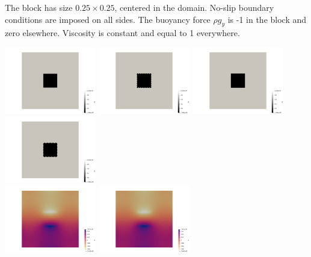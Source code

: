 The block has size $0.25\times 0.25$, centered in the domain. No-slip boundary conditions are imposed on all 
sides. The buoyancy force $\rho g_y$ is -1 in the block and zero elsewhere. Viscosity is constant and 
equal to 1 everywhere. 

\begin{center}
\includegraphics[width=4cm]{python_codes/fieldstone_78/results/block/reduced/by0}
\includegraphics[width=4cm]{python_codes/fieldstone_78/results/block/reduced/by1}
\includegraphics[width=4cm]{python_codes/fieldstone_78/results/block/reduced/by2}
\includegraphics[width=4cm]{python_codes/fieldstone_78/results/block/reduced/by3}\\
\includegraphics[width=4cm]{python_codes/fieldstone_78/results/block/reduced/p0}
\includegraphics[width=4cm]{python_codes/fieldstone_78/results/block/reduced/p1}

\end{center}
